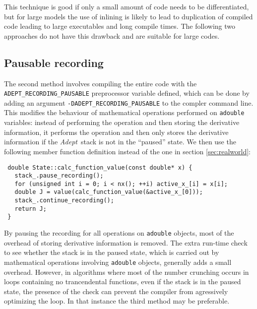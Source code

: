 \documentclass[a4,oneside]{book}
\def\codesize{\small}
\def\Adept{\emph{Adept}}
\def\code#1{{\codesize\texttt{#1}}}
\begin{document}
This technique is good if only a small amount of code needs to be
differentiated, but for large models the use of inlining is likely to
lead to duplication of compiled code leading to large executables and
long compile times.  The following two approaches do not have this
drawback and are suitable for large codes.

\subsection{Pausable recording}
\label{sec:pausable}
The second method involves compiling the entire code with the
\code{ADEPT\_RECORDING\_PAUSABLE} preprocessor variable defined, which
can be done by adding an argument \code{-DADEPT\_RECORDING\_PAUSABLE}
to the compler command line. This modifies the behaviour of
mathematical operations performed on \code{adouble} variables: instead
of performing the operation and then storing the derivative
information, it performs the operation and then only stores the
derivative information if the \Adept\ stack is not in the ``paused''
state. We then use the following member function definition instead of
the one in section \ref{sec:realworld}:
%
\begin{lstlisting}
 double State::calc_function_value(const double* x) {
   stack_.pause_recording();
   for (unsigned int i = 0; i < nx(); ++i) active_x_[i] = x[i];
   double J = value(calc_function_value(&active_x_[0]));
   stack_.continue_recording();
   return J;
 }
\end{lstlisting}
%
By pausing the recording for all operations on \code{adouble} objects,
most of the overhead of storing derivative information is removed. The
extra run-time check to see whether the stack is in the paused state,
which is carried out by mathematical operations involving
\code{adouble} objects, generally adds a small overhead.  However, in
algorithms where most of the number crunching occurs in loops
containing no trancendental functions, even if the stack is in the
paused state, the presence of the check can prevent the compiler from
agressively optimizing the loop.  In that instance the third method
may be preferable.
%
\end{document}

